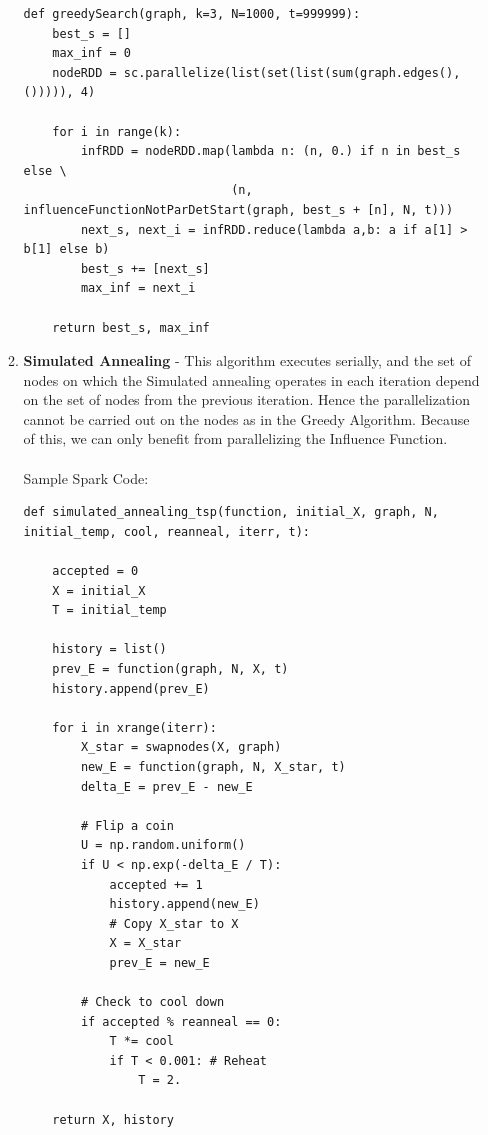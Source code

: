 \documentclass[11pt]{scrartcl} %
\begin{document}
\begin{enumerate}[A)]
\begin{enumerate}
\small\begin{verbatim}
def greedySearch(graph, k=3, N=1000, t=999999):
    best_s = []
    max_inf = 0
    nodeRDD = sc.parallelize(list(set(list(sum(graph.edges(), ())))), 4)
    
    for i in range(k):
        infRDD = nodeRDD.map(lambda n: (n, 0.) if n in best_s else \
                             (n, influenceFunctionNotParDetStart(graph, best_s + [n], N, t)))
        next_s, next_i = infRDD.reduce(lambda a,b: a if a[1] > b[1] else b)
        best_s += [next_s]
        max_inf = next_i
    
    return best_s, max_inf
\end{verbatim}


\item \textbf{Simulated Annealing} - This algorithm executes serially, and the set of nodes on which the Simulated annealing operates in each iteration depend on the set of nodes from the previous iteration. Hence the parallelization cannot be carried out on the nodes as in the Greedy Algorithm.  Because of this, we can only benefit from parallelizing the Influence Function.   \\
\\
Sample Spark Code:\\

\small\begin{verbatim}
def simulated_annealing_tsp(function, initial_X, graph, N, initial_temp, cool, reanneal, iterr, t):
    
    accepted = 0
    X = initial_X
    T = initial_temp
    
    history = list()
    prev_E = function(graph, N, X, t)
    history.append(prev_E)
    
    for i in xrange(iterr):
        X_star = swapnodes(X, graph)
        new_E = function(graph, N, X_star, t) 
        delta_E = prev_E - new_E
        
        # Flip a coin
        U = np.random.uniform()
        if U < np.exp(-delta_E / T):
            accepted += 1
            history.append(new_E)
            # Copy X_star to X
            X = X_star
            prev_E = new_E

        # Check to cool down
        if accepted % reanneal == 0:
            T *= cool
            if T < 0.001: # Reheat
                T = 2.
            
    return X, history
\end{verbatim}


\end{enumerate}
\end{enumerate}
\end{document}

